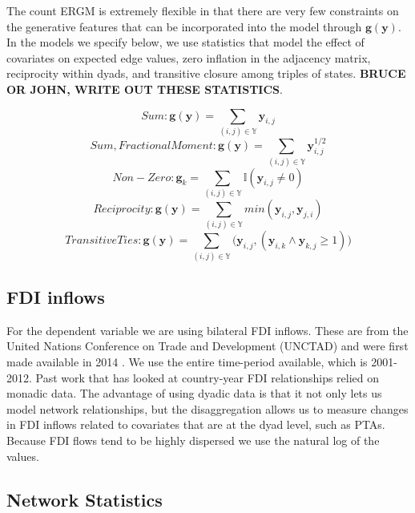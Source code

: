 \documentclass{article}
\begin{document}
The count ERGM is extremely flexible in that there are very few constraints on the generative features that can be incorporated into the model through $\bm{g}( \bm{y} )$. In the models we specify below, we use statistics that model the effect of covariates on expected edge values, zero inflation in the adjacency matrix, reciprocity within dyads, and transitive closure among triples of states. {\bf BRUCE OR JOHN, WRITE OUT THESE STATISTICS}.

$$Sum:\bm{g(y)} = \sum_{(i,j) {\in} \mathbb{Y}}\bm{y}_{i,j}$$
$$Sum, Fractional Moment:\bm{g(y)} = \sum_{(i,j) {\in} \mathbb{Y}}\bm{y}_{i,j}^{1/2}$$
$$Non-Zero: \bm{g}_k = \sum_{(i,j) {\in} \mathbb{Y}} \mathbb{I}(\bm{y}_{i,j} \neq 0)$$
$$ Reciprocity: \bm{g(y)} = \sum_{(i,j) {\in} \mathbb{Y}}min(\bm{y}_{i,j},\bm{y}_{j,i})$$
$$Transitive Ties: \bm{g(y)} = \sum_{(i,j) {\in} \mathbb{Y}} \Big(\bm{y}_{i,j},(\bm{y}_{i,k} \land \bm{y}_{k,j} \geq 1)\Big) $$







\subsection{FDI inflows}

For the dependent variable we are using bilateral FDI inflows. These are from the United Nations Conference on Trade and Development (UNCTAD) and were first made available in 2014 \citep{UNCTAD}. We use the entire time-period available, which is 2001-2012. Past work that has looked at country-year FDI relationships relied on monadic data. The advantage of using dyadic data is that it not only lets us model network relationships, but the disaggregation allows us to measure changes in FDI inflows related to covariates that are at the dyad level, such as PTAs. Because FDI flows tend to be highly dispersed we use the natural log of the values. 

\subsection{Network Statistics}
\end{document}
